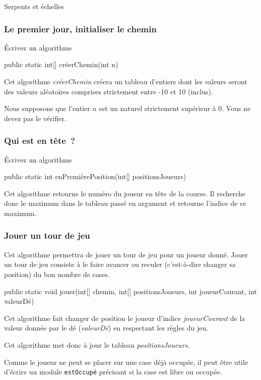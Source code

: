 \begin{Exercice}{Serpents et échelles}
		\subsubsection*{Le premier jour, initialiser le chemin}
		
			Écrivez un algorithme 
			\begin{java}
public static int[] créerChemin(int n)
			\end{java}
			
			Cet algorithme \textit{créerChemin} créera un tableau d’entiers dont
			les valeurs seront des valeurs aléatoires comprises strictement
			entre -10 et 10 (inclus). 
		
			Nous supposons que l’entier $n$ est un naturel strictement supérieur
			à 0.  Vous ne devez pas le vérifier. 
	
		\subsubsection*{Qui est en tête~?}
	
			Écrivez un algorithme 
	
			\begin{java}
public static int enPremièrePosition(int[] positionsJoueurs)
			\end{java}

			Cet algorithme retourne le numéro du joueur en tête de la course. 
			Il recherche donc le maximum dans le tableau passé en
			argument et retourne l’indice de ce maximum. 
	
		\subsubsection*{Jouer un tour de jeu}
	
			Cet algorithme permettra de jouer un tour de jeu pour un joueur
			donné. Jouer un tour de jeu consiste à le faire avancer ou reculer
			(c’est-à-dire changer sa position) du bon nombre de cases. 
	
			\begin{java}
public static void jouer(int[] chemin,
		int[] positionsJoueurs,
		int joueurCourant,
		int valeurDé)
			\end{java}
		
			Cet algorithme fait changer de position le joueur d’indice
			\textit{joueurCourant} de la valeur donnée par le dé
			(\textit{valeurDé}) en respectant les règles du jeu. 
		
			Cet algorithme met donc à jour le tableau \textit{positionsJoueurs}. 
		
			Comme le joueur ne peut se placer sur une case déjà occupée, il peut
			être utile d’écrire un module \texttt{estOccupé} précisant si la
			case est libre ou occupée.  
	
		\end{Exercice}


